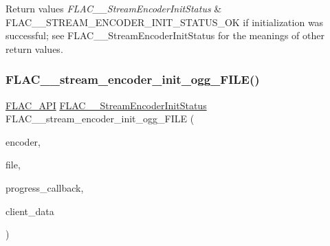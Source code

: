 \begin{DoxyRetVals}{Return values}
{\em F\+L\+A\+C\+\_\+\+\_\+\+Stream\+Encoder\+Init\+Status} & {\ttfamily F\+L\+A\+C\+\_\+\+\_\+\+S\+T\+R\+E\+A\+M\+\_\+\+E\+N\+C\+O\+D\+E\+R\+\_\+\+I\+N\+I\+T\+\_\+\+S\+T\+A\+T\+U\+S\+\_\+\+OK} if initialization was successful; see F\+L\+A\+C\+\_\+\+\_\+\+Stream\+Encoder\+Init\+Status for the meanings of other return values. \\
\hline
\end{DoxyRetVals}
\mbox{\label{group__flac__stream__encoder_gab44c7f51a61826e04abd8cdf5c1ceac2}} 
\subsubsection{\texorpdfstring{F\+L\+A\+C\+\_\+\+\_\+stream\+\_\+encoder\+\_\+init\+\_\+ogg\+\_\+\+F\+I\+L\+E()}{FLAC\_\_stream\_encoder\_init\_ogg\_FILE()}}
{\footnotesize\ttfamily \hyperlink{group__flac__export_ga56ca07df8a23310707732b1c0007d6f5}{F\+L\+A\+C\+\_\+\+A\+PI} \hyperlink{group__flac__stream__encoder_ga3bb869620af2b188d77982a5c30b047d}{F\+L\+A\+C\+\_\+\+\_\+\+Stream\+Encoder\+Init\+Status} F\+L\+A\+C\+\_\+\+\_\+stream\+\_\+encoder\+\_\+init\+\_\+ogg\+\_\+\+F\+I\+LE (\begin{DoxyParamCaption}\item[{\hyperlink{struct_f_l_a_c_____stream_encoder}{F\+L\+A\+C\+\_\+\+\_\+\+Stream\+Encoder} $\ast$}]{encoder,  }\item[{F\+I\+LE $\ast$}]{file,  }\item[{\hyperlink{group__flac__stream__encoder_ga6e051c0e5837433f9e7cd56cd42ca6ba}{F\+L\+A\+C\+\_\+\+\_\+\+Stream\+Encoder\+Progress\+Callback}}]{progress\+\_\+callback,  }\item[{\hyperlink{png_8h_ac9c84fa68bbad002983e35ce3663c686}{void} $\ast$}]{client\+\_\+data }\end{DoxyParamCaption})}

